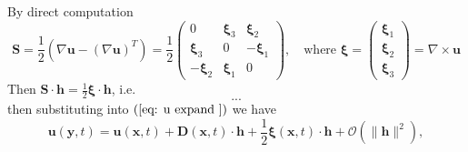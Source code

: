 By direct computation 
\begin{equation}
\textbf{S} = \frac{1}{2}\left(\nabla \textbf{u}-(\nabla\textbf{u})^T\right)
= \frac{1}{2}\begin{pmatrix}
0 & \mathbf{\xi}_3 & \mathbf{\xi}_2 \\
\mathbf{\xi}_3 & 0 & -\mathbf{\xi}_1 \\
-\mathbf{\xi}_2 & \mathbf{\xi}_1 & 0
\end{pmatrix},\quad\text{where }
\mathbf{\xi} = \begin{pmatrix}\mathbf{\xi}_1\\\mathbf{\xi}_2\\\mathbf{\xi}_3\end{pmatrix}
= \nabla \times \textbf{u}
\end{equation}
Then $\displaystyle \textbf{S}\cdot \textbf{h} = \frac{1}{2}\mathbf{\xi} \cdot \textbf{h}$, i.e. 
\begin{equation}
...
\end{equation}
then substituting into $(\ref{eq: u expand })$ we have
\begin{equation}
\textbf{u}(\textbf{y},t) = \textbf{u}(\textbf{x},t) + \textbf{D}(\textbf{x},t)\cdot \textbf{h} + \frac{1}{2}\mathbf{\xi}(\textbf{x},t)\cdot \textbf{h} + \mathcal{O}\left(\lVert \textbf{h}\rVert^2\right),
\end{equation}


